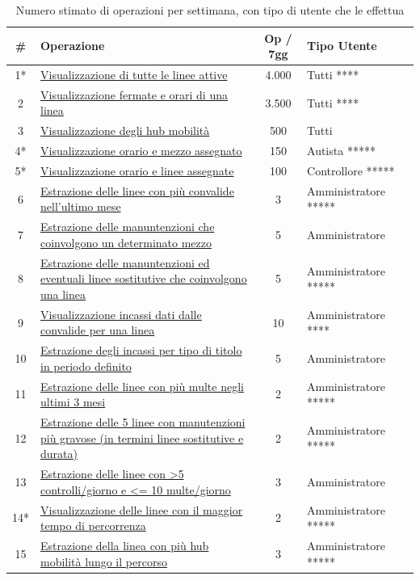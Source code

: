 \documentclass[12pt,a4paper]{report}
\begin{document}
\begin{longtable}{|c|p{9cm}|c|l|l|}
\caption{Numero stimato di operazioni per settimana, con tipo di utente che le effettua}
\label{table:operazioni}\\
\hline
\textbf{\#} & \textbf{Operazione} & \textbf{Op / 7gg} & \textbf{Tipo Utente} \\
\hline
\endhead
1*  & \hyperref[op1]{Visualizzazione di tutte le linee attive} & 4.000 & Tutti **** \\
\hline
2 & \hyperref[op2]{Visualizzazione fermate e orari di una linea} & 3.500 & Tutti **** \\
\hline
3 & \hyperref[op3]{Visualizzazione degli hub mobilità} & 500 & Tutti \\
\hline
4* & \hyperref[op4]{Visualizzazione orario e mezzo assegnato} & 150 & Autista ***** \\
\hline
5* & \hyperref[op5]{Visualizzazione orario e linee assegnate} & 100 & Controllore ***** \\
\hline
6 & \hyperref[op6]{Estrazione delle linee con più convalide nell'ultimo mese} & 3 & Amministratore *****  \\
\hline
7 & \hyperref[op7]{Estrazione delle manuntenzioni che coinvolgono un determinato mezzo} & 5 & Amministratore \\
\hline
8 & \hyperref[op8]{Estrazione delle manuntenzioni ed eventuali linee sostitutive che coinvolgono una linea} & 5 & Amministratore ***** \\
\hline
9 & \hyperref[op9]{Visualizzazione incassi dati dalle convalide per una linea} & 10 & Amministratore **** \\
\hline
10 & \hyperref[op10]{Estrazione degli incassi per tipo di titolo in periodo definito} & 5 & Amministratore \\
\hline
11 & \hyperref[op11]{Estrazione delle linee con più multe negli ultimi 3 mesi} & 2 & Amministratore ***** \\
\hline
12 & \hyperref[op12]{Estrazione delle 5 linee con manutenzioni più gravose (in termini linee sostitutive e durata)} & 2 & Amministratore *****  \\
\hline
13 & \hyperref[op13]{Estrazione delle linee con \textgreater 5 controlli/giorno e \textless = 10 multe/giorno} & 3 & Amministratore  \\
\hline
14* & \hyperref[op14]{Visualizzazione delle linee con il maggior tempo di percorrenza} & 2 & Amministratore ***** \\
\hline
15 & \hyperref[op15]{Estrazione della linea con più hub mobilità lungo il percorso} & 3 & Amministratore ***** \\

\end{longtable}
\end{document}
